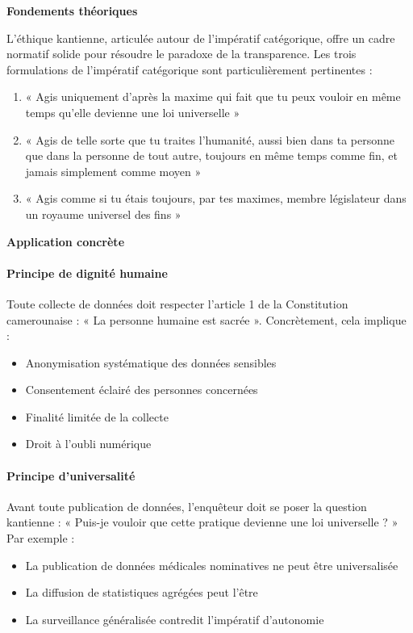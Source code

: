 \documentclass[12pt,a4paper]{article}
\begin{document}
\textbf{Fondements théoriques}

L'éthique kantienne, articulée autour de l'impératif catégorique, offre un cadre normatif solide pour résoudre le paradoxe de la transparence. Les trois formulations de l'impératif catégorique sont particulièrement pertinentes :

\begin{enumerate}
\item « Agis uniquement d'après la maxime qui fait que tu peux vouloir en même temps qu'elle devienne une loi universelle »
\item « Agis de telle sorte que tu traites l'humanité, aussi bien dans ta personne que dans la personne de tout autre, toujours en même temps comme fin, et jamais simplement comme moyen »
\item « Agis comme si tu étais toujours, par tes maximes, membre législateur dans un royaume universel des fins »
\end{enumerate}

\textbf{Application concrète}

\paragraph{Principe de dignité humaine}
Toute collecte de données doit respecter l'article 1 de la Constitution camerounaise : « La personne humaine est sacrée ». Concrètement, cela implique :
\begin{itemize}
\item Anonymisation systématique des données sensibles
\item Consentement éclairé des personnes concernées
\item Finalité limitée de la collecte
\item Droit à l'oubli numérique
\end{itemize}

\paragraph{Principe d'universalité}
Avant toute publication de données, l'enquêteur doit se poser la question kantienne : « Puis-je vouloir que cette pratique devienne une loi universelle ? » Par exemple :
\begin{itemize}
\item La publication de données médicales nominatives ne peut être universalisée
\item La diffusion de statistiques agrégées peut l'être
\item La surveillance généralisée contredit l'impératif d'autonomie
\end{itemize}
\end{document}
